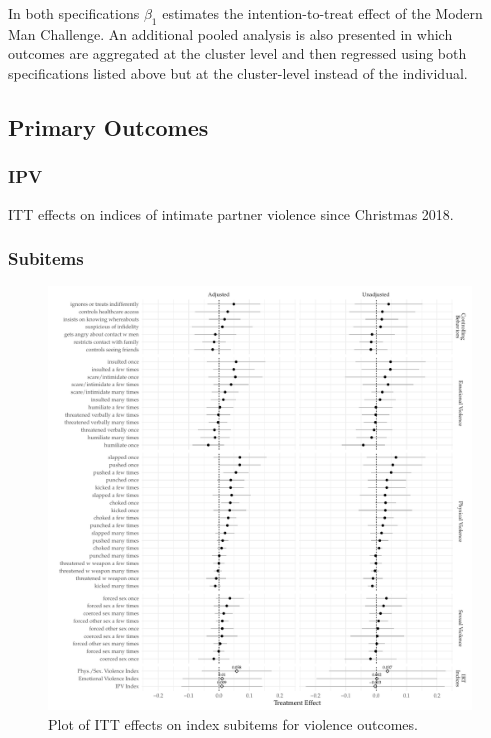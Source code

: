 \documentclass[11pt,english]{article}
\begin{document}
In both specifications $\beta_1$ estimates the intention-to-treat effect of the Modern Man Challenge. An additional pooled analysis is also presented in which outcomes are aggregated at the cluster level and then regressed using both specifications listed above but at the cluster-level instead of the individual.

\subsection{Primary Outcomes}

\subsubsection{IPV}

\begin{table}[H]
\centering

\caption{ITT effects on indices of intimate partner violence since Christmas 2018.}
\label{tab:ipv}
\end{table}

\subsubsection{Subitems}

\begin{figure}[H]
\centering
\includegraphics[width = \textwidth]{figures/subitem_plot.pdf}
\caption{Plot of ITT effects on index subitems for violence outcomes.}
\label{fig:subitem_plot}
\end{figure}
\end{document}
